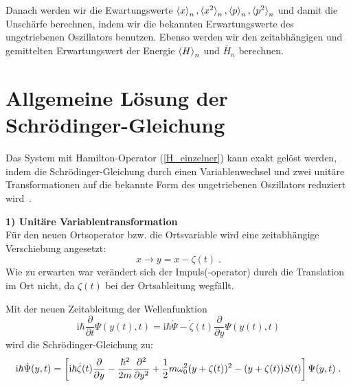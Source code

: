       Danach werden wir die Ewartungswerte $\braket{x}_n,\braket{x^2}_n,\braket{p}_n,\braket{p^2}_n$ und damit die Unschärfe berechnen, indem wir die bekannten Erwartungswerte des ungetriebenen Oszillators benutzen.
      Ebenso werden wir den zeitabhängigen und gemittelten Erwartungswert der Energie $\braket{H}_n$ und $\overline{H}_n$ berechnen.
\fi


    \section{Allgemeine Lösung der Schrödinger-Gleichung}
      \label{lsg_einzelner}
      Das System mit Hamilton-Operator (\ref{H_einzelner}) kann exakt gelöst werden, indem die Schrödinger-Gleichung durch einen Variablenwechsel und zwei unitäre Transformationen auf die bekannte Form des ungetriebenen Oszillators reduziert wird~\cite{haengi}.

      \textbf{1) Unitäre Variablentransformation}\\
      Für den neuen Ortsoperator bzw. die Ortsvariable wird eine zeitabhängige Verschiebung angesetzt:
      \begin{equation}
        x \rightarrow y=x-\zeta(t) \; .
      \end{equation}
      Wie zu erwarten war verändert sich der Impuls(-operator) durch die Translation im Ort nicht, da $\zeta(t)$ bei der Ortsableitung wegfällt.

      Mit der neuen Zeitableitung der Wellenfunktion
      \begin{equation}
        \text{i}\hbar \frac{\partial}{\partial t} \Psi(y(t),t) = \text{i}\hbar \dot{\Psi} -\dot \zeta(t)\frac{\partial}{\partial y}\Psi(y(t),t)
      \end{equation}
      wird die Schrödinger-Gleichung zu:
      \begin{equation}
        \text i \hbar \dot{\Psi}(y,t) = \left[\text i \hbar \dot \zeta(t)\frac{\partial}{\partial y}-\frac{\hbar^2}{2m}\frac{\partial^2}{\partial y^2}+\frac{1}{2}m\omega_0^2(y+\zeta(t))^2-(y+\zeta(t))S(t)\right]\Psi(y,t) \; .
        \label{schroedinger_einzeln_getrieben}
      \end{equation}

